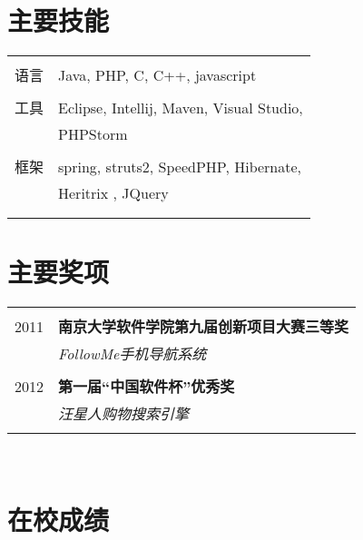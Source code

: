 \documentclass[10pt]{article} %
\begin{document}
{\begin{minipage}[t]{0.44\textwidth}
\section{主要技能} 

\begin{tabular}{rl}
& \\
语言
& Java, PHP, C, C++, javascript\\ 
& \\
工具
& Eclipse, Intellij, Maven, Visual Studio,\\
& PHPStorm\\
& \\
框架
& spring, struts2, SpeedPHP, Hibernate,\\
& Heritrix , JQuery\\
& \\ \\
\end{tabular}


\section{主要奖项} 

\begin{tabular}{rl}
& \\
2011	 & \textbf{南京大学软件学院第九届创新项目大赛三等奖}\\
& \textit{FollowMe手机导航系统}\\ \\


2012	 & \textbf{第一届“中国软件杯”优秀奖}\\
& \textit{汪星人购物搜索引擎}\\ 
& \\
\end{tabular}\\[10pt]



\section{在校成绩} 


\end{minipage}}
\end{document}

